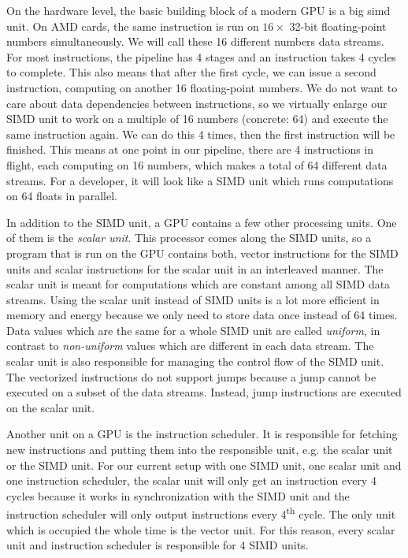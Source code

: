 On the hardware level, the basic building block of a modern GPU is a big \gls{simd} unit. On AMD cards, the same instruction is run on $16 \times$ 32-bit floating-point numbers simultaneously. We will call these 16 different numbers data streams. For most instructions, the pipeline has 4 stages and an instruction takes 4 cycles to complete. This also means that after the first cycle, we can issue a second instruction, computing on another 16 floating-point numbers. We do not want to care about data dependencies between instructions, so we virtually enlarge our SIMD unit to work on a multiple of 16 numbers (concrete: 64) and execute the same instruction again. We can do this 4 times, then the first instruction will be finished. This means at one point in our pipeline, there are 4 instructions in flight, each computing on 16 numbers, which makes a total of 64 different data streams. For a developer, it will look like a SIMD unit which runs computations on 64 floats in parallel.

In addition to the SIMD unit, a GPU contains a few other processing units. One of them is the \emph{scalar unit}. This processor comes along the SIMD units, so a program that is run on the GPU contains both, vector instructions for the SIMD units and scalar instructions for the scalar unit in an interleaved manner. The scalar unit is meant for computations which are constant among all SIMD data streams. Using the scalar unit instead of SIMD units is a lot more efficient in memory and energy because we only need to store data once instead of 64 times. Data values which are the same for a whole SIMD unit are called \emph{uniform}, in contrast to \emph{non-uniform} values which are different in each data stream. The scalar unit is also responsible for managing the control flow of the SIMD unit. The vectorized instructions do not support jumps because a jump cannot be executed on a subset of the data streams. Instead, jump instructions are executed on the scalar unit.

Another unit on a GPU is the instruction scheduler. It is responsible for fetching new instructions and putting them into the responsible unit, e.g. the scalar unit or the SIMD unit. For our current setup with one SIMD unit, one scalar unit and one instruction scheduler, the scalar unit will only get an instruction every 4 cycles because it works in synchronization with the SIMD unit and the instruction scheduler will only output instructions every 4\textsuperscript{th} cycle. The only unit which is occupied the whole time is the vector unit. For this reason, every scalar unit and instruction scheduler is responsible for 4 SIMD units.

